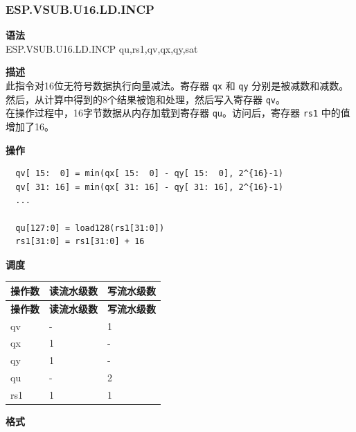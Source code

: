 \newpage

\newpage
\subsubsection{ESP.VSUB.U16.LD.INCP}\label{instruction:ESPVSUBU16LDINCP}
\textbf{语法}\\
ESP.VSUB.U16.LD.INCP qu,rs1,qv,qx,qy,sat

\textbf{描述}\\
此指令对16位无符号数据执行向量减法。寄存器 \lstinline{qx} 和 \lstinline{qy} 分别是被减数和减数。然后，从计算中得到的8个结果被饱和处理，然后写入寄存器 \lstinline{qv}。\\ 在操作过程中，16字节数据从内存加载到寄存器 \lstinline{qu}。访问后，寄存器 \lstinline{rs1} 中的值增加了16。

\textbf{操作}\\
\begin{lstlisting}
  qv[ 15:  0] = min(qx[ 15:  0] - qy[ 15:  0], 2^{16}-1)
  qv[ 31: 16] = min(qx[ 31: 16] - qy[ 31: 16], 2^{16}-1)
  ...

  qu[127:0] = load128(rs1[31:0])
  rs1[31:0] = rs1[31:0] + 16
\end{lstlisting}


\textbf{调度}\\
\begin{longtable}[c]{|l|l|l|}
    \hline
    \rowcolor{lightgray}
    \textbf{操作数} & \textbf{读流水级数} & \textbf{写流水级数} \\\hline
    \endfirsthead
    \hline
    \rowcolor{lightgray}
     \textbf{操作数} & \textbf{读流水级数} & \textbf{写流水级数} \\\hline
    \endhead
    \hline
    \endfoot

  qv & - & 1 \\\hline
    qx & 1 & - \\\hline
    qy & 1 & - \\\hline
    qu & - & 2 \\\hline
    rs1 & 1 & 1

\end{longtable}

\textbf{格式}\\

